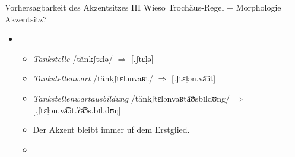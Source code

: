 \begin{frame}
  {Vorhersagbarkeit des Akzentsitzes III}
  \onslide<+->
  \onslide<+->
  Wieso Trochäus-Regel + Morphologie = Akzentsitz?\\
  \onslide<+->
  \Halbzeile
  \begin{itemize}[<+->]
    \item {}
    \begin{itemize}[<+->]
      \item \textit{Tankstelle} /tănkʃtɛlə/ \ensuremath{\Rightarrow} [.ʃtɛḷə]
      \item \textit{Tankstellenwart} /tănkʃtɛlənvaʁt/ \ensuremath{\Rightarrow} [.ʃtɛḷən.va͡ət]
      \item \textit{Tankstellenwartausbildung} /tănkʃtɛlənvaʁta͡ʊsbɪldʊng/ \ensuremath{\Rightarrow} [.ʃtɛḷən.va͡ət.ʔa͡ɔs.bɪl.dʊŋ]
        \Halbzeile
      \item Der Akzent bleibt immer uf dem Erstglied.
      \item {}
    \end{itemize}
  \end{itemize}
\end{frame}

